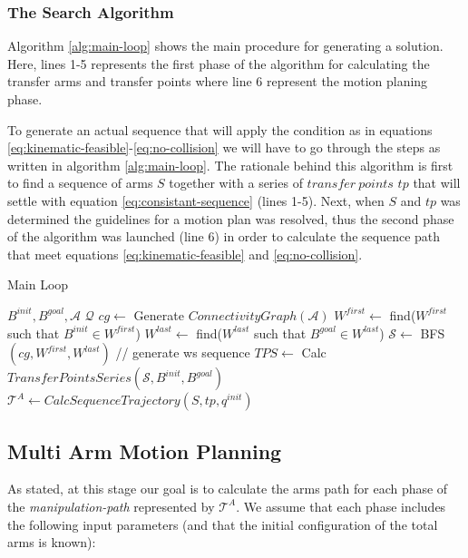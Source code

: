 \documentclass[english]{article}
\theoremstyle{definition}
\begin{document}
\subsubsection*{The Search Algorithm}
Algorithm \ref{alg:main-loop} shows the main procedure for generating a solution. Here, lines 1-5 represents the first phase of the algorithm for calculating the transfer arms and transfer points where line 6 represent the motion planing phase. 

To generate an actual sequence that will apply the condition as in equations \eqref{eq:kinematic-feasible}-\eqref{eq:no-collision} we will have to go through the steps as written in algorithm \ref{alg:main-loop}. The rationale behind this algorithm is first to find a sequence of arms $S$ together with a series of $transfer~points$ $tp$ that will settle with equation \eqref{eq:consistant-sequence} (lines 1-5). Next, when $S$ and $tp$ was determined the guidelines for a motion plan was resolved, thus the second phase of the algorithm was launched (line 6) in order to calculate the sequence path that meet equations \eqref{eq:kinematic-feasible} and \eqref{eq:no-collision}. 

\begin{algorithm}
\caption{Main Loop} \label{alg:main-loop}
\begin{algorithmic}  [1] %
\REQUIRE $B^{init},B^{goal},\mathcal{A}$
\ENSURE $\mathcal{Q}$
	\STATE $cg\leftarrow$ Generate $ConnectivityGraph\left(\mathcal{A}\right)$
	\STATE $W^{first}\leftarrow $ find($W^{first}$ such that $B^{init}\in W^{first}$)
	\STATE $W^{last}\leftarrow $ find($W^{last}$ such that $B^{goal}\in W^{last}$)
	\STATE $\mathcal{S}\leftarrow$ BFS$( cg,W^{first},W^{last})$ // generate ws sequence
	\STATE $TPS\leftarrow$ Calc $TransferPointsSeries\left(\mathcal{S},B^{init},B^{goal}\right)$
\STATE $\mathcal{T}^A \leftarrow CalcSequenceTrajectory( S,tp,q^{init})$
\end{algorithmic}
\end{algorithm}


\subsection{Multi Arm Motion Planning}
As stated, at this stage our goal is to calculate the arms path for each phase of the \textit{manipulation-path} represented by $\mathcal{T}^A$. We assume that each phase includes the following input parameters (and that the initial configuration of the total arms is known):
\end{document}
